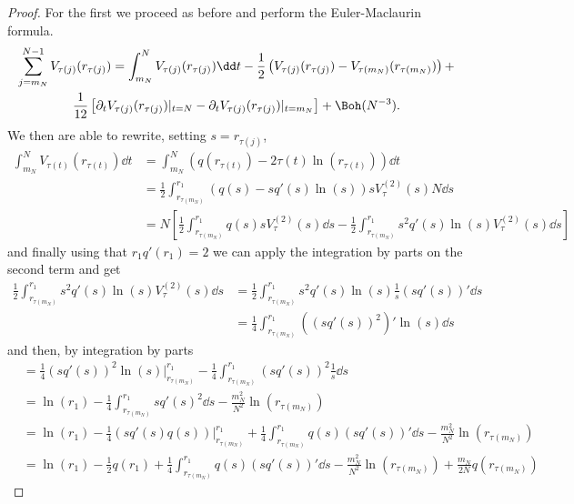 \begin{proof}
For the first we proceed as before and perform the Euler-Maclaurin formula. 	\begin{multline}
	\sum_{j=m_N}^{N-1} V_{\tau(j)}(r_{\tau(j)}) = \int_{m_N}^N V_{\tau(j)}(r_{\tau(j)})  \dd t - \frac{1}{2} \left( V_{\tau(j)}(r_{\tau(j)})  - V_{\tau(m_N)}(r_{\tau(m_N)}) \right) + \\ \frac{1}{12} \left[ \partial_t V_{\tau(j)}(r_{\tau(j)}) |_{t=N} - \partial_t V_{\tau(j)}(r_{\tau(j)}) |_{t=m_N} \right] + \Boh(N^{-3}).
	\label{Equation: EulerMaclaurin 1 annulus}
\end{multline}
We then are able to rewrite, setting $s = r_{\tau(j)}$,
\begin{align}
	\int_{m_N}^N V_{\tau(t)}(r_{\tau(t)})  \dd t & = \int_{m_N}^N (q(r_{\tau(t)}) - 2 \tau(t) \ln(r_{\tau(t)})) \dd t \\
	& = \frac{1}{2} \int_{r_{\tau(m_N)}}^{r_1} (q(s) - s q'(s) \ln(s)) s V^{(2)}_{\tau}(s) N \dd s \\
	& = N \left[  \frac{1}{2} \int_{r_{\tau(m_N)}}^{r_1} q(s) s V^{(2)}_{\tau}(s) \dd s -  \frac{1}{2} \int_{r_{\tau(m_N)}}^{r_1} s^2 q'(s) \ln(s) V^{(2)}_{\tau}(s) \dd s \right]
\end{align}
and finally using that $r_1 q'(r_1) = 2$ we can apply the integration by parts on the second term and get
\begin{align}
	\frac{1}{2} \int_{r_{\tau(m_N)}}^{r_1} s^2 q'(s) \ln(s) V^{(2)}_{\tau}(s) \dd s 
	& = \frac{1}{2} \int_{r_{\tau(m_N)}}^{r_1} s^2 q'(s) \ln(s) \frac{1}{s} (s q'(s))' \dd s \\
	& = \frac{1}{4} \int_{r_{\tau(m_N)}}^{r_1} ((sq'(s))^2)' \ln(s) \dd s
\end{align}
and then, by integration by parts
\begin{align}
	& = \frac{1}{4} (s q'(s))^2 \ln(s) |_{r_{\tau(m_N)}}^{r_1} - \frac{1}{4}  \int_{r_{\tau(m_N)}}^{r_1} (s q'(s))^2 \frac{1}{s} \dd s \\
	& = \ln(r_1) - \frac{1}{4} \int_{r_{\tau(m_N)}}^{r_1} s q'(s)^2 \dd s - \frac{m_N^2}{N^2} \ln(r_{\tau(m_N)}) \\
		& = \ln(r_1) - \frac{1}{4} (s q'(s) q(s)) |_{r_{\tau(m_N)}}^{r_1} + \frac{1}{4} \int_{r_{\tau(m_N)}}^{r_1} q(s) (s q'(s))' \dd s  - \frac{m_N^2}{N^2} \ln(r_{\tau(m_N)}) \\
	& = \ln(r_1) - \frac{1}{2} q(r_1) + \frac{1}{4} \int_{r_{\tau(m_N)}}^{r_1} q(s) (s q'(s))'\dd s  - \frac{m_N^2}{N^2} \ln(r_{\tau(m_N)}) + \frac{m_N}{2 N} q(r_{\tau(m_N)})
\end{align}

\end{proof}
